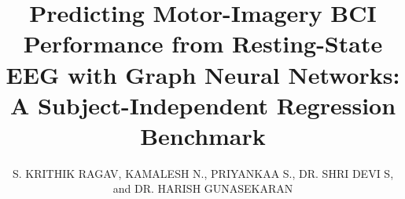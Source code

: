 \documentclass{ieeeaccess}
\begin{document}

\title{Predicting Motor-Imagery BCI Performance from Resting-State EEG with Graph Neural Networks: A Subject-Independent Regression Benchmark}

\author{
\uppercase{S. Krithik Ragav},
\uppercase{Kamalesh N.},
\uppercase{Priyankaa S.},
\uppercase{Dr. Shri Devi S},
and \uppercase{Dr. Harish Gunasekaran}
}

\address[1]{Department of Electronics and Communication Engineering, Vellore Institute of Technology, Chennai Campus, Chennai 600127, Tamil Nadu, India (e-mail: krithikragav.s2024@vitstudent.ac.in)}
\address[2]{School of Computer Science and Engineering, Vellore Institute of Technology, Chennai Campus, Chennai 600127, Tamil Nadu, India (e-mail: kamalesh.n2024@vitstudent.ac.in, priyankaa.s2024@vitstudent.ac.in, shridevi.s@vit.ac.in)}
\address[3]{Adjunct Professor, Vellore Institute of Technology, Chennai 600127, Tamil Nadu, India (e-mail: harish.gunasekaran@vit.ac.in)}


\end{document}

